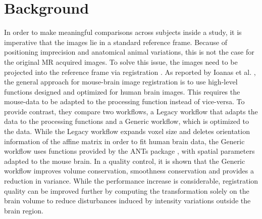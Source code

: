 \section{Background}
In order to make meaningful comparisons across subjects inside a study, it is imperative that the images lie in a standard reference frame.
Because of positioning imprecision and anatomical animal variations, this is not the case for the original MR acquired images.
To solve this issue, the images need to be projected into the reference frame via registration \cite{maintz_overview_nodate, sotiras_deformable_2013}.
As reported by Ioanas et al. \cite{ioanas_optimized_2019}, the general approach for mouse-brain image registration is to use high-level functions designed and optimized for human brain images.
This requires the mouse-data to be adapted to the processing function instead of vice-versa.
To provide contrast, they compare two workflows, a Legacy workflow that adapts the data to the processing functions and a Generic workflow, which is optimized to the data.
While the Legacy workflow expands voxel size and deletes orientation information of the affine matrix in order to fit human brain data, the Generic workflow uses functions provided by the ANTs package \cite{ants}, with spatial parameters adapted to the mouse brain.
In a quality control, it is shown that the Generic workflow improves volume conservation, smoothness conservation and provides a reduction in variance.
While the performance increase is considerable, registration quality can be improved further by computing the transformation solely on the brain volume to reduce disturbances induced by intensity variations outside the brain region.
